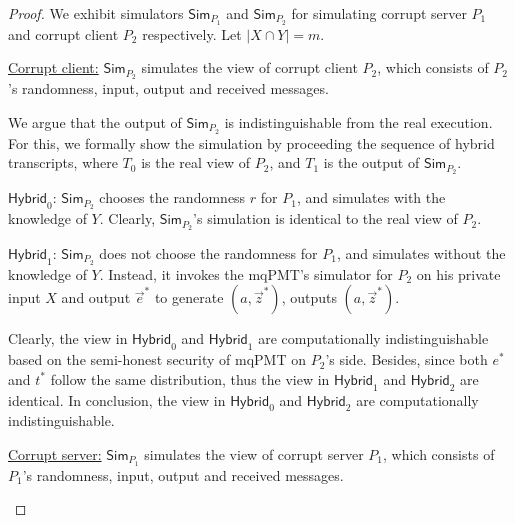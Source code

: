 \documentclass[a4paper,10pt]{article}
\begin{document}
\begin{proof}
We exhibit simulators $\mathsf{Sim}_{P_1}$ and $\mathsf{Sim}_{P_2}$ for simulating corrupt server $P_1$ 
and corrupt client $P_2$ respectively. Let $|X \cap Y| = m$. 

\begin{trivlist}
\item \underline{Corrupt client:} $\mathsf{Sim}_{P_2}$ simulates the view of corrupt client $P_2$, 
which consists of $P_2$'s randomness, input, output and received messages.

We argue that the output of $\mathsf{Sim}_{P_2}$ is indistinguishable from the real execution. 
For this, we formally show the simulation by proceeding the sequence of hybrid transcripts, 
where $T_0$ is the real view of $P_2$, and $T_1$ is the output of $\mathsf{Sim}_{P_2}$. 
\item $\mathsf{Hybrid}_0$: $\mathsf{Sim}_{P_2}$ chooses the randomness $r$ for $P_1$, 
    and simulates with the knowledge of $Y$. Clearly, $\mathsf{Sim}_{P_2}$'s simulation is identical to the real view of $P_2$.    

\item $\mathsf{Hybrid}_1$: $\mathsf{Sim}_{P_2}$ does not choose the randomness for $P_1$, 
    and simulates without the knowledge of $Y$. 
    Instead, it invokes the mqPMT's simulator for $P_2$ on his private input $X$ and output $\vec{e}^*$ 
    to generate $(a, \vec{z}^*)$, outputs $(a, \vec{z}^*)$.  

\item {}  

\item Clearly, the view in $\mathsf{Hybrid}_0$ and $\mathsf{Hybrid}_1$ are computationally indistinguishable 
    based on the semi-honest security of mqPMT on $P_2$'s side. 
    Besides, since both $e^*$ and $t^*$ follow the same distribution, 
    thus the view in $\mathsf{Hybrid}_1$ and $\mathsf{Hybrid}_2$ are identical. 
    In conclusion, the view in $\mathsf{Hybrid}_0$ and $\mathsf{Hybrid}_2$ are computationally indistinguishable. 


\item \underline{Corrupt server:} $\mathsf{Sim}_{P_1}$ simulates the view of corrupt server $P_1$, 
which consists of $P_1$'s randomness, input, output and received messages.


\end{trivlist}
\end{proof}
\end{document}
